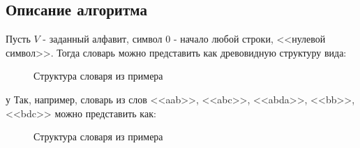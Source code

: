 \documentclass[a4paper,12pt]{article}
\begin{document}
\subsection{Описание алгоритма}
Пусть $V$ - заданный алфавит, символ $0$ - начало любой строки, <<нулевой символ>>. Тогда словарь можно представить как древовидную структуру вида: \\
\begin{figure}[H]
\caption{Структура словаря из примера}
\label{images:tree1}
\end{figure}у
Так, например, словарь из слов <<aab>>, <<abc>>, <<abda>>, <<bb>>, <<bdc>> можно представить как:
\begin{figure}[H]
\caption{Структура словаря из примера}
\label{images:tree2}
\end{figure}
\end{document}

